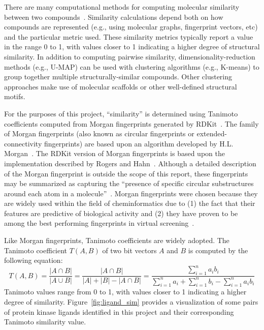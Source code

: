 \documentclass[11pt]{article}
\begin{document}
There are many computational methods for computing molecular similarity between two compounds~\cite{molsim_2024}. Similarity calculations depend both on how compounds are represented (e.g., using molecular graphs, fingerprint vectors, etc) and the particular metric used. 
These similarity metrics typically report a value in the range 0 to 1, with values closer to 1 indicating a higher degree of structural similarity. In addition to computing pairwise similarity, dimensionality-reduction methods (e.g., U-MAP) can be used with clustering algorithms (e.g., K-means) to group together multiple structurally-similar compounds. Other clustering approaches make use of molecular scaffolds or other well-defined structural motifs.

For the purposes of this project, ``similarity'' is determined using Tanimoto coefficients computed from Morgan fingerprints generated by RDKit~\cite{greg_landrum_2024_11396708}. 
The family of Morgan fingerprints (also known as circular fingerprints or extended-connectivity fingerprints) are based upon an algorithm developed by H.L. Morgan~\cite{morgan_1965}. 
The RDKit version of Morgan fingerprints is based upon the implementation described by Rogers and Hahn~\cite{rogers_hahn_2010}. 
Although a detailed description of the Morgan fingerprint is outside the scope of this report, these fingerprints may be summarized as capturing the ``presence of specific circular substructures around each atom in a molecule''~\cite{capecchi_probst_reymond_2020}. 
Morgan fingerprints were chosen because they are widely used within the field of cheminformatics due to (1) the fact that their features are predictive of biological activity and (2) they have proven to be among the best performing fingerprints in virtual screening~\cite{capecchi_probst_reymond_2020}. 

Like Morgan fingerprints, Tanimoto coefficients are widely adopted. 
The Tanimoto coefficient $T(A,B)$ of two bit vectors $A$ and $B$ is computed by the following equation:
\begin{equation}\label{eq:1}
T(A,B) = \frac{|A \cap B|}{|A \cup B|} = \frac{|A \cap B|}{|A| + |B| - |A \cap B|} = \frac{\sum_{i=1}^{n} a_i b_i}{\sum_{i=1}^{n} a_i + \sum_{i=1}^{n} b_i - \sum_{i=1}^{n} a_i b_i}
\end{equation}
\noindent
Tanimoto values range from 0 to 1, with values closer to 1 indicating a higher degree of similarity.
Figure~\ref{fig:ligand_sim} provides a visualization of some pairs of protein kinase ligands identified in this project and their corresponding Tanimoto similarity value.
\end{document}
